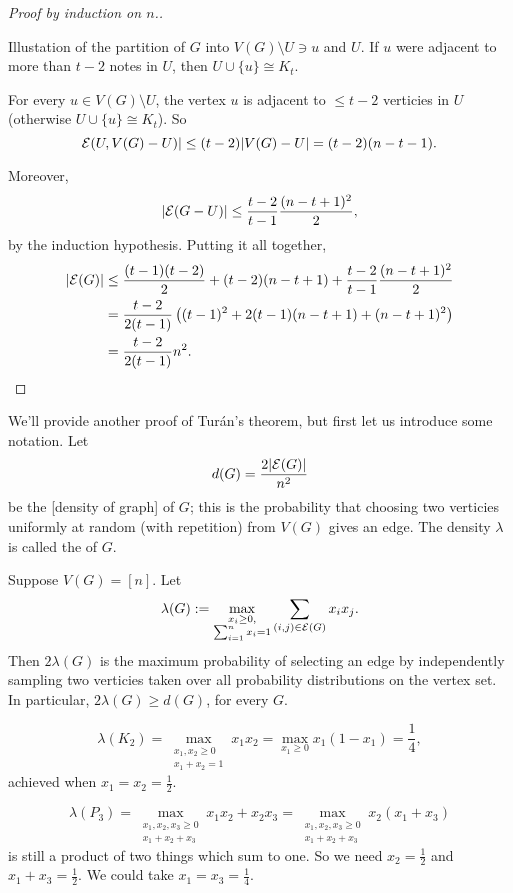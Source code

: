 \begin{proof}[Proof by induction on $n$.]
\begin{marginfigure}
\begin{center}
\begin{tikzpicture}

\end{tikzpicture}
\end{center}
\caption{ Illustation of the partition of $G$ into $V(G)\setminus U \ni u$ and $U$. If $u$ were adjacent to more than $t-2$ notes in $U$, then $U\cup \{u\} \cong K_t$. \label{fig:U_VG-U}}
\end{marginfigure}



 For every $u\in V(G)\setminus U$, the vertex $u$ is adjacent to $\leq t-2$ verticies in $U$ (otherwise $U\cup\{u\}\cong K_t$). So
 \[
 \edges (U,V(G)-U)| \leq (t-2) |V(G)-U| = (t-2)(n-t-1).
 \]

 Moreover,
 \[
 |\edges (G\setminus U)|  \leq \frac{t-2}{t-1}\frac{(n-t+1)^2}{2},
 \]
 by the induction hypothesis. Putting it all together,
 \begin{align*}
 |\edges (G)| &\leq \frac{(t-1)(t-2)}{2} + (t-2)(n-t+1) + \frac{t-2}{t-1}\frac{(n-t+1)^2}{2}\\
 &= \frac{t-2}{2(t-1)} \left( (t-1)^2 + 2(t-1) (n-t+1) + (n-t+1)^2 \right)\\
 &= \frac{t-2}{2(t-1)} n^2.\qedhere
 \end{align*}
\end{proof}
We'll provide another proof of Tur\'an's theorem, but first let us introduce some notation. Let 
\[
d(G) = \frac{2|\edges (G)|}{n^2}
\]
be the [density of graph] of $G$; this is the probability that choosing two verticies uniformly at random (with repetition) from $V(G)$ gives an edge. The density $\lambda$ is called the  of $G$.

Suppose $V(G) = [n]$. Let 
\[
\lambda(G) := \max_{\substack{x_i\geq 0,\\ \sum_{i=1}^n x_i=1}} \sum_{(i,j) \in \edges (G)} x_i x_j.
\]
Then $2\lambda(G)$ is the maximum probability of selecting an edge by independently sampling two verticies taken over all probability distributions on the vertex set. In particular, $2\lambda(G) \geq d(G)$, for every $G$.

\begin{example}
\[
\lambda(K_2) = \max_{\substack{x_1,x_2\geq 0 \\ x_1+x_2=1}} x_1 x_2 =\max_{x_1\geq 0} x_1(1-x_1) = \frac{1}{4},
\]
achieved when $x_1=x_2=\frac{1}{2}$.

\[
\lambda(P_3) = \max_{\substack{x_1,x_2,x_3\geq 0\\ x_1+x_2+x_3}} x_1x_2 + x_2x_3 = \max_{\substack{x_1,x_2,x_3\geq 0\\ x_1+x_2+x_3}} x_2(x_1+x_3)
\]
is still a product of two things which sum to one. So we need $x_2=\frac{1}{2}$ and $x_1+x_3=\frac{1}{2}$. We could take $x_1=x_3=\frac{1}{4}$.
\end{example}


